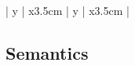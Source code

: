 \documentclass[12pt]{article}
\begin{document}
\begin{longtable}{| y | x{3.5cm} | y | x{3.5cm} |}
	\end{longtable} 
	
\subsection{Semantics}
\end{document}
